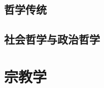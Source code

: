 \documentclass[UTF8]{RepresentationUniverse}
\begin{document}
\section{哲学传统}
\section{社会哲学与政治哲学}

\chapter{宗教学}
\end{document}
